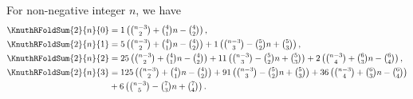 \begin{example} For non-negative integer $n$, we have
  \begin{align*}
    \KnuthRFoldSum{2}{n}{0}
    &= 1 \left( \tbinom{n-3}{2} + \tbinom{4}{1} n - \tbinom{4}{2} \right),
    \\
    \KnuthRFoldSum{2}{n}{1}
    &= 5 \left( \tbinom{n-3}{2} + \tbinom{4}{1} n - \tbinom{4}{2} \right)
    + 1 \left( \tbinom{n-3}{3} - \tbinom{5}{2} n + \tbinom{5}{3} \right),
    \\
    \KnuthRFoldSum{2}{n}{2}
    &= 25 \left( \tbinom{n-3}{2} + \tbinom{4}{1} n - \tbinom{4}{2} \right)
    + 11 \left( \tbinom{n-3}{3} - \tbinom{5}{2} n + \tbinom{5}{3} \right)
    + 2 \left( \tbinom{n-3}{4} + \tbinom{6}{3} n - \tbinom{6}{4} \right),
    \\
    \KnuthRFoldSum{2}{n}{3}
    &=
    125 \left( \tbinom{n-3}{2} + \tbinom{4}{1} n - \tbinom{4}{2} \right)
    + 91 \left( \tbinom{n-3}{3} - \tbinom{5}{2} n + \tbinom{5}{3} \right)
    + 36 \left( \tbinom{n-3}{4} + \tbinom{6}{3} n - \tbinom{6}{4} \right) \\
    &+ 6 \left( \tbinom{n-3}{5} - \tbinom{7}{3} n + \tbinom{7}{4} \right).
  \end{align*}
\end{example}

